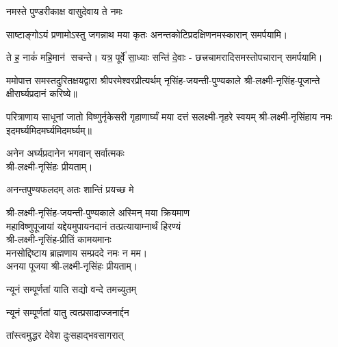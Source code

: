 \begin{center}
{नमस्ते पुण्डरीकाक्ष वासुदेवाय ते नमः}

{साष्टाङ्गोऽयं प्रणामोऽस्तु जगन्नाथ मया कृतः}
अनन्तकोटिप्रदक्षिणनमस्कारान् समर्पयामि।\medskip

{ते ह॒ नाकं॑ महि॒मान॑ सचन्ते। यत्र॒ पूर्वे॑ सा॒ध्याः सन्ति॑ दे॒वाः}
- छत्त्रचामरादिसमस्तोपचारान् समर्पयामि।\medskip


\begin{center}




\end{center}


ममोपात्त समस्तदुरितक्षयद्वारा श्रीपरमेश्वरप्रीत्यर्थम्  नृसिंह-जयन्ती-पुण्यकाले  श्री-लक्ष्मी-नृसिंह-पूजान्ते क्षीरार्घ्यप्रदानं करिष्ये॥
\medskip

{परित्राणाय   साधूनां   जातो   विष्णुर्नृकेसरी}
{गृहाणार्घ्यं   मया   दत्तं   सलक्ष्मी-नृहरे   स्वयम्}
	श्री-लक्ष्मी-नृसिंहाय नमः इदमर्घ्यमिदमर्घ्यमिदमर्घ्यम्॥\medskip

अनेन अर्घ्यप्रदानेन भगवान् सर्वात्मकः\\ श्री-लक्ष्मी-नृसिंहः प्रीयताम्।\medskip

{अनन्तपुण्यफलदम् अतः शान्तिं प्रयच्छ मे}

श्री-लक्ष्मी-नृसिंह-जयन्ती-पुण्यकाले अस्मिन् मया क्रियमाण\\
महाविष्णुपूजायां यद्देयमुपायनदानं तत्प्रत्यायाम्नार्थं हिरण्यं\\
श्री-लक्ष्मी-नृसिंह-प्रीतिं कामयमानः\\
मनसोद्दिष्टाय ब्राह्मणाय सम्प्रददे नमः न मम।\\ 
अनया पूजया श्री-लक्ष्मी-नृसिंहः प्रीयताम्। 
 

{न्यूनं सम्पूर्णतां याति सद्यो वन्दे तमच्युतम्}

{न्यूनं सम्पूर्णतां यातु त्वत्प्रसादाज्जनार्द्दन}

{तांस्त्वमुद्धर   देवेश   दुःसहाद्भवसागरात्}


\end{center}
